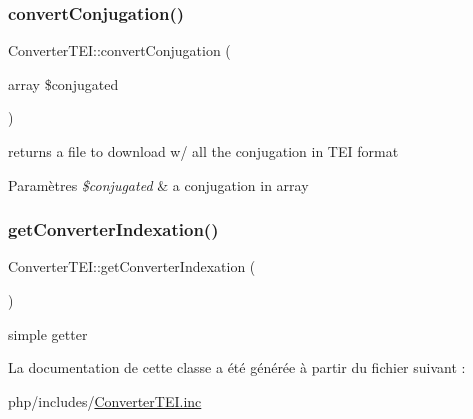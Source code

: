 \subsubsection{\texorpdfstring{convert\+Conjugation()}{convertConjugation()}}
{\footnotesize\ttfamily Converter\+T\+E\+I\+::convert\+Conjugation (\begin{DoxyParamCaption}\item[{array}]{\$conjugated }\end{DoxyParamCaption})}

returns a file to download w/ all the conjugation in T\+EI format 
\begin{DoxyParams}{Paramètres}
{\em \$conjugated} & a conjugation in array \\
\hline
\end{DoxyParams}
\hypertarget{classConverterTEI_a49fd33e0b0401c7bfaef1cca1bcee72c}{}\label{classConverterTEI_a49fd33e0b0401c7bfaef1cca1bcee72c} 
\subsubsection{\texorpdfstring{get\+Converter\+Indexation()}{getConverterIndexation()}}
{\footnotesize\ttfamily Converter\+T\+E\+I\+::get\+Converter\+Indexation (\begin{DoxyParamCaption}{ }\end{DoxyParamCaption})}

simple getter 

La documentation de cette classe a été générée à partir du fichier suivant \+:\begin{DoxyCompactItemize}
\item 
php/includes/\hyperlink{ConverterTEI_8inc}{Converter\+T\+E\+I.\+inc}\end{DoxyCompactItemize}
